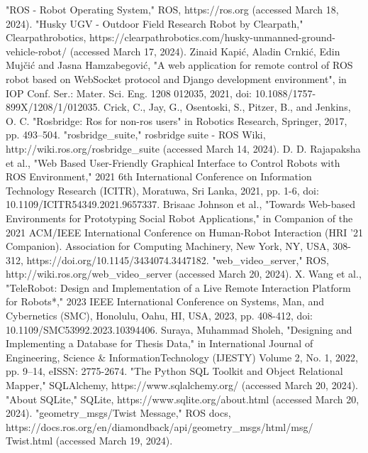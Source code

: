 \documentclass[conference]{IEEEtran}
\begin{document}
\begin{thebibliography}{00}
"ROS - Robot Operating System," ROS, https://ros.org (accessed March 18, 2024).
"Husky UGV - Outdoor Field Research Robot by Clearpath," Clearpathrobotics, https://clearpathrobotics.com/husky-unmanned-ground-vehicle-robot/ (accessed March 17, 2024).
 Zinaid Kapić, Aladin Crnkić, Edin Mujčić and Jasna Hamzabegović, "A web application for remote control of ROS robot based on WebSocket protocol and Django development environment", in IOP Conf. Ser.: Mater. Sci. Eng. 1208 012035, 2021, doi: 10.1088/1757-899X/1208/1/012035.
 Crick, C., Jay, G., Osentoski, S., Pitzer, B., and Jenkins, O. C. "Rosbridge: Ros for non-ros users" in Robotics Research, Springer, 2017, pp. 493--504.
"rosbridge\_suite," rosbridge suite - ROS Wiki, http://wiki.ros.org/rosbridge\_suite (accessed March 14, 2024).
 D. D. Rajapaksha et al., "Web Based User-Friendly Graphical Interface to Control Robots with ROS Environment," 2021 6th International Conference on Information Technology Research (ICITR), Moratuwa, Sri Lanka, 2021, pp. 1-6, doi: 10.1109/ICITR54349.2021.9657337.
Brisaac Johnson et al., "Towards Web-based Environments for Prototyping Social Robot Applications," in Companion of the 2021 ACM/IEEE International Conference on Human-Robot Interaction (HRI '21 Companion). Association for Computing Machinery, New York, NY, USA, 308-312, https://doi.org/10.1145/3434074.3447182.
"web\_video\_server," ROS, http://wiki.ros.org/web\_video\_server (accessed March 20, 2024).
X. Wang et al., "TeleRobot: Design and Implementation of a Live Remote Interaction Platform for Robots*," 2023 IEEE International Conference on Systems, Man, and Cybernetics (SMC), Honolulu, Oahu, HI, USA, 2023, pp. 408-412, doi: 10.1109/SMC53992.2023.10394406.
 Suraya, Muhammad Sholeh, "Designing and Implementing a Database for Thesis Data," in International Journal of Engineering, Science \& InformationTechnology (IJESTY) Volume 2, No. 1, 2022, pp. 9--14, eISSN: 2775-2674.
"The Python SQL Toolkit and Object Relational Mapper," SQLAlchemy, https://www.sqlalchemy.org/ (accessed March 20, 2024).
"About SQLite," SQLite, https://www.sqlite.org/about.html (accessed March 20, 2024).
"geometry\_msgs/Twist Message," ROS docs, https://docs.ros.org/en/diamondback/api/geometry\_msgs/html/msg/\\Twist.html (accessed March 19, 2024).

\end{thebibliography}
\end{document}
